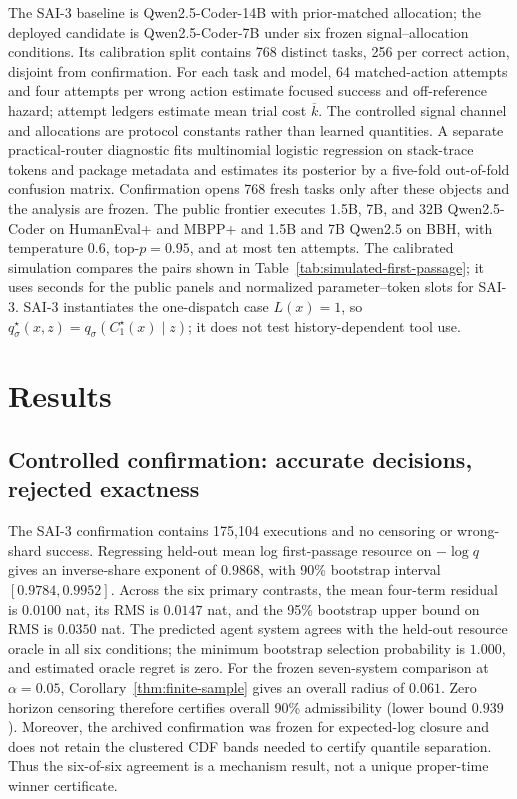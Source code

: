 \documentclass{article}
\theoremstyle{definition}
\theoremstyle{plain}
\theoremstyle{remark}
\begin{document}
The SAI-3 baseline is Qwen2.5-Coder-14B with prior-matched allocation; the
deployed candidate is Qwen2.5-Coder-7B under six frozen signal--allocation
conditions.  Its calibration split contains 768 distinct tasks, 256 per correct
action,
disjoint from confirmation.  For each task and model, 64 matched-action attempts
and four attempts per wrong action estimate focused success and off-reference
hazard; attempt ledgers estimate mean trial cost \(\overline k\).  The controlled signal channel and
allocations are protocol constants rather than learned quantities.  A separate
practical-router diagnostic fits multinomial logistic regression on stack-trace
tokens and package metadata and estimates its posterior by a five-fold
out-of-fold confusion matrix.  Confirmation opens 768 fresh tasks only after
these objects and the analysis are frozen.  The public frontier executes 1.5B, 7B,
and 32B Qwen2.5-Coder on HumanEval+ and MBPP+ and 1.5B and 7B Qwen2.5 on BBH,
with temperature \(0.6\), top-\(p=0.95\), and at most ten attempts.  The
calibrated simulation compares the pairs shown in
Table~\ref{tab:simulated-first-passage}; it uses seconds for the public panels
and normalized parameter--token slots for SAI-3.
SAI-3 instantiates the one-dispatch case \(L(x)=1\), so
\(q_\sigma^\star(x,z)=q_\sigma(C_1^\star(x)\mid z)\); it does not test
history-dependent tool use.

\section{Results}
\label{sec:results}

\subsection{Controlled confirmation: accurate decisions, rejected exactness}

The SAI-3 confirmation contains 175,104 executions and no censoring
or wrong-shard success.  Regressing held-out mean log first-passage resource on
\(-\log q\) gives an inverse-share exponent of \(0.9868\), with 90\% bootstrap
interval \([0.9784,0.9952]\).  Across the six primary contrasts, the mean
four-term residual is \(0.0100\) nat, its RMS is \(0.0147\) nat, and the 95\%
bootstrap upper bound on RMS is \(0.0350\) nat.  The predicted agent system agrees
with the held-out resource oracle in all six conditions; the minimum bootstrap
selection probability is \(1.000\), and estimated oracle regret is zero.
For the frozen seven-system comparison at \(\alpha=0.05\),
Corollary~\ref{thm:finite-sample} gives an overall radius of \(0.061\).  Zero
horizon censoring therefore certifies overall 90\% admissibility (lower bound
\(0.939\)).  Moreover,
the archived confirmation was frozen for expected-log closure and does not
retain the clustered CDF bands needed to certify quantile separation.  Thus the
six-of-six agreement is a mechanism result, not a unique proper-time winner
certificate.
\end{document}
